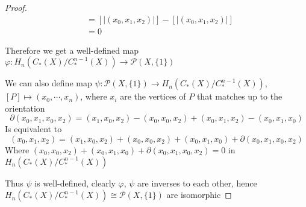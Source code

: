 \documentclass[../main.tex]{subfiles}
\begin{document}
\begin{proof}
\begin{align*}
&=[|(x_0,x_1,x_2)|]-[|(x_0,x_1,x_2)|] \\
&=0
\end{align*}
\begin{center}
\end{center}
Therefore we get a well-defined map $\varphi:H_n(C_*(X)/C_*^{n-1}(X))\to\mathcal P(X,\{1\})$ \par
We can also define map $\psi:\mathcal P(X,\{1\})\to H_n(C_*(X)/C_*^{n-1}(X))$, $[P]\mapsto (x_0,\cdots,x_n)$, where $x_i$ are the vertices of $P$ that matches up to the orientation
\[\partial(x_0,x_1,x_0,x_2)=(x_1,x_0,x_2)-(x_0,x_0,x_2)+(x_0,x_1,x_2)-(x_0,x_1,x_0)\]
Is equivalent to
\[(x_0,x_1,x_2)=(x_1,x_0,x_2)+(x_0,x_0,x_2)+(x_0,x_1,x_0)+\partial(x_0,x_1,x_0,x_2)\]
Where $(x_0,x_0,x_2)+(x_0,x_1,x_0)+\partial(x_0,x_1,x_0,x_2)=0$ in $H_n(C_*(X)/C_*^{n-1}(X))$ \par
Thus $\psi$ is well-defined, clearly $\varphi$, $\psi$ are inverses to each other, hence $H_n(C_*(X)/C_*^{n-1}(X))\cong\mathcal P(X,\{1\})$ are isomorphic
\end{proof}
\end{document}
